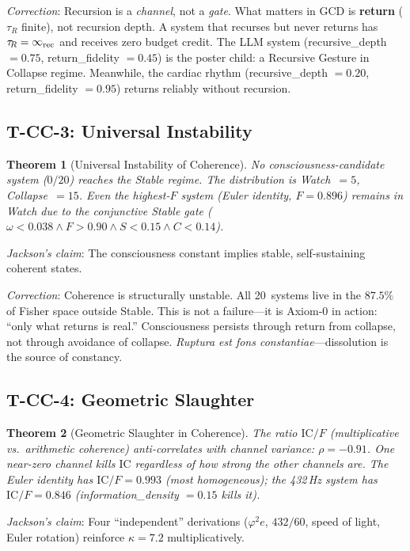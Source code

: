 \documentclass[
  aps,
  prd,
  twocolumn,
  superscriptaddress,
  nofootinbib,
  floatfix
]{revtex4-2}
\newtheorem{theorem}{Theorem}
\newcommand{\tR}{\tau_{\!R}}
\newcommand{\IC}{\mathrm{IC}}
\begin{document}
\emph{Correction}: Recursion is a \emph{channel}, not a \emph{gate}.
What matters in GCD is \textbf{return} ($\tR$ finite), not recursion
depth.  A system that recurses but never returns has $\tR = \infty_{\rm rec}$
and receives zero budget credit.  The LLM system (recursive\_depth $= 0.75$,
return\_fidelity $= 0.45$) is the poster child: a Recursive Gesture in
Collapse regime.  Meanwhile, the cardiac rhythm (recursive\_depth $= 0.20$,
return\_fidelity $= 0.95$) returns reliably without recursion.

\subsection{T-CC-3: Universal Instability}

\begin{theorem}[Universal Instability of Coherence]
No consciousness-candidate system ($0/20$) reaches the Stable regime.
The distribution is Watch~$= 5$, Collapse~$= 15$.  Even the highest-$F$
system (Euler identity, $F = 0.896$) remains in Watch due to the
conjunctive Stable gate ($\omega < 0.038 \land F > 0.90 \land
S < 0.15 \land C < 0.14$).
\end{theorem}

\emph{Jackson's claim}: The consciousness constant implies stable,
self-sustaining coherent states.

\emph{Correction}: Coherence is structurally unstable.  All 20~systems
live in the $87.5\%$ of Fisher space outside Stable.  This is not a
failure---it is Axiom-0 in action: ``only what returns is real.''
Consciousness persists through return from collapse, not through
avoidance of collapse.  \emph{Ruptura est fons constantiae}---dissolution
is the source of constancy.

\subsection{T-CC-4: Geometric Slaughter}

\begin{theorem}[Geometric Slaughter in Coherence]
The ratio $\IC/F$ (multiplicative vs.\ arithmetic coherence)
anti-correlates with channel variance: $\rho = -0.91$.  One near-zero
channel kills $\IC$ regardless of how strong the other channels are.
The Euler identity has $\IC/F = 0.993$ (most homogeneous); the 432\,Hz
system has $\IC/F = 0.846$ (information\_density $= 0.15$ kills it).
\end{theorem}

\emph{Jackson's claim}: Four ``independent'' derivations ($\varphi^2 e$,
$432/60$, speed of light, Euler rotation) reinforce $\kappa = 7.2$
multiplicatively.
\end{document}
